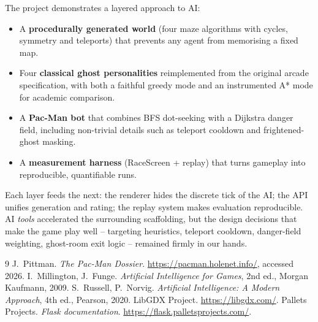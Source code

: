 \documentclass[11pt,a4paper]{article}
\begin{document}
The project demonstrates a layered approach to AI:

\begin{itemize}[leftmargin=1.3em,itemsep=1pt]
  \item A \textbf{procedurally generated world} (four maze algorithms
        with cycles, symmetry and teleports) that prevents any agent
        from memorising a fixed map.
  \item Four \textbf{classical ghost personalities} reimplemented from
        the original arcade specification, with both a faithful greedy
        mode and an instrumented A* mode for academic comparison.
  \item A \textbf{Pac-Man bot} that combines BFS dot-seeking with a
        Dijkstra danger field, including non-trivial details such as
        teleport cooldown and frightened-ghost masking.
  \item A \textbf{measurement harness} (RaceScreen + replay) that turns
        gameplay into reproducible, quantifiable runs.
\end{itemize}

Each layer feeds the next: the renderer hides the discrete tick of the
AI; the API unifies generation and rating; the replay system makes
evaluation reproducible. AI \emph{tools} accelerated the surrounding
scaffolding, but the design decisions that make the game play well --
targeting heuristics, teleport cooldown, danger-field weighting,
ghost-room exit logic -- remained firmly in our hands.

\begin{thebibliography}{9}
\small
{} J.~Pittman. \emph{The Pac-Man Dossier}.
        \url{https://pacman.holenet.info/}, accessed 2026.
 I.~Millington, J.~Funge.
        \emph{Artificial Intelligence for Games}, 2nd ed.,
        Morgan Kaufmann, 2009.
 S.~Russell, P.~Norvig.
        \emph{Artificial Intelligence: A Modern Approach}, 4th ed.,
        Pearson, 2020.
 LibGDX Project. \url{https://libgdx.com/}.
 Pallets Projects. \emph{Flask documentation}.
        \url{https://flask.palletsprojects.com/}.
\end{thebibliography}
\end{document}
